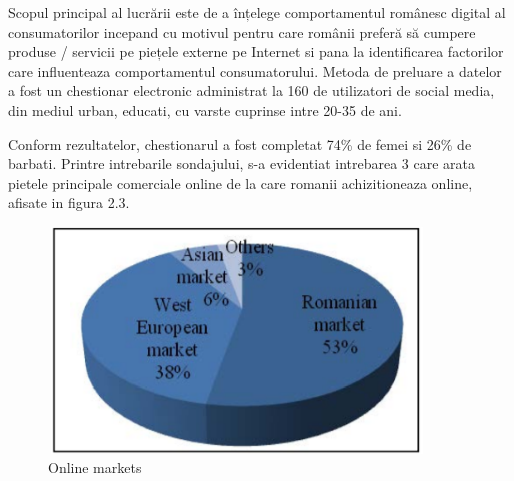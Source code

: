 \documentclass[a4paper, 12pt]{article}
\begin{document}
		\quad Scopul principal al lucrării este de a înțelege comportamentul românesc digital al consumatorilor incepand cu motivul pentru care românii preferă să cumpere produse / servicii pe piețele externe pe Internet si pana la identificarea factorilor care influenteaza comportamentul consumatorului. Metoda de preluare a datelor a fost un chestionar electronic administrat la 160 de utilizatori de social media, din mediul urban, educati, cu varste cuprinse intre 20-35 de ani.
		
		\quad Conform rezultatelor, chestionarul a fost completat 74\% de femei si 26\% de barbati. Printre intrebarile sondajului, s-a evidentiat intrebarea 3 care arata pietele principale comerciale online de la care romanii achizitioneaza online, afisate in figura 2.3. 
		\begin{figure}[!htb]
			\centering
			\includegraphics[width=10cm, height=6cm]{"figures/sixth.png"}
			\caption{Online markets}\label{fig:sixth}
		\end{figure}
	
\end{document}
